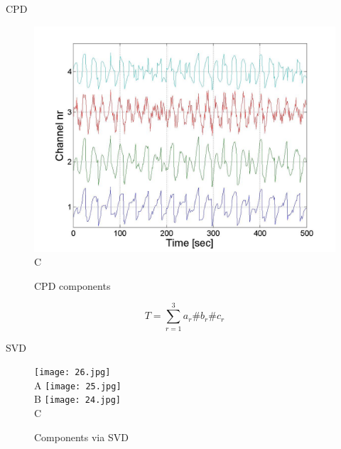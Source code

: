 \documentclass[t,12pt,english
\ifx\beamermode\undefined\else,\beamermode\fi
]{beamer}
\begin{document}
\begin{frame}{CPD}
\begin{figure}[!htbp]
\includegraphics[width=1\textwidth]{13.jpg}\\
\tiny{C}
\endminipage\hfill
\caption{\tiny CPD components}\label{a15}
\end{figure}

\begin{equation}
    T=\sum_{r=1}^{3}a_{r}\#b_{r}\#c_{r}
\end{equation}

\end{frame}

\begin{frame}{SVD}

 \begin{figure}[!htbp]
%
\centering
\texttt{[image: 26.jpg]}\\
\tiny{A}
\endminipage\hfill
{}%
\centering
\texttt{[image: 25.jpg]}\\
\tiny{B}
\endminipage\hfill
{}%
\centering
\texttt{[image: 24.jpg]}\\
\tiny{C}
\endminipage\hfill
\caption{\tiny Components via SVD}\label{A1}
\end{figure}

\end{frame}
\end{document}
